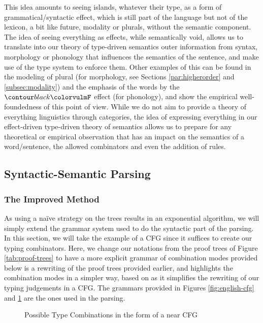 \medskip

This idea amounts to seeing islands, whatever their type, as a form of
grammatical/syntactic effect, which is still part of the language but not of
the lexicon, a bit like future, modality or plurals, without the semantic
component.
The idea of seeing everything as effects, while semantically void, allows us
to translate into our theory of type-driven semantics outer information from
syntax, morphology or phonology that influences the semantics of the
sentence, and make use of the type system to enforce them.
Other examples of this can be found in the modeling of plural (for
morphology, see Sections \ref{par:higherorder} and \ref{subsec:modality})
and the emphasis of the words by the $\f{F}$ effect (for phonology), and show
the empirical well-foundedness of this point of view.
While we do not aim to provide a theory of everything linguistics through
categories, the idea of expressing everything in our effect-driven type-driven
theory of semantics allows us to prepare for any theoretical or empirical
observation that has an impact on the semantics of a word/sentence, the allowed
combinators and even the addition of rules.

\subsection{Syntactic-Semantic Parsing}
\label{subsec:ssparsing}
\subsubsection{The Improved Method}
As using a naïve strategy on the trees results in an exponential algorithm,
we will simply extend the grammar system used to do the syntactic part of the
parsing.
In this section, we will take the example of a CFG since it suffices to create
our typing combinators.
Here, we change our notations from the proof trees of Figure
\ref{tab:proof-trees} to have a more explicit grammar of combination modes
provided below is a rewriting of the proof trees provided earlier, and
highlights the combination modes in a simpler way, based on
\cite{bumfordEffectdrivenInterpretationFunctors2025} as it simplifies the
rewriting of our typing judgements in a CFG.
The grammars provided in Figures \ref{fig:english-cfg} and
\ref{fig:combination-cfg} are the ones used in the parsing.

\begin{figure}
	\centering
	\caption{Possible Type Combinations in the form of a near CFG}
	\label{fig:combination-cfg}
\end{figure}

